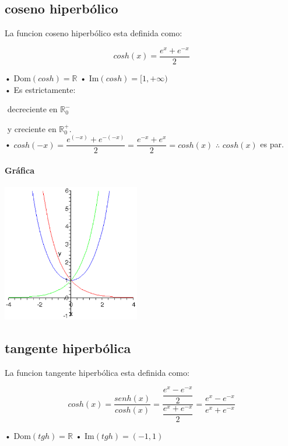 \subsection{coseno hiperbólico}

La funcion coseno hiperbólico esta definida como:

$$cosh(x)=\dfrac{e^x+e^{-x}}{2}$$

• Dom$(cosh) = \mathbb{R}$ \qquad  • Im$(cosh) = [1,+\infty)$\\

• Es estrictamente: 

\qquad $ $\qquad $ $\qquad $ $\qquad $ $\qquad $ $ decreciente en $\mathbb{R} _0 ^-$

\qquad $ $\qquad $ $\qquad $ $\qquad $ $ \qquad $ $y creciente en $\mathbb{R} _0 ^+$.\\

• $cosh(-x) = \dfrac{e^{(-x)}+e^{-(-x)}}{2} = \dfrac{e^{-x}+e^x}{2} = cosh(x)$ \qquad $\therefore$ $cosh(x)$ es par.

\paragraph{Gráfica}
\begin{center}
\includegraphics[height=6cm,width=6cm]{cosh.eps}
\end{center}

\subsection{tangente hiperbólica}

La funcion tangente hiperbólica esta definida como:

$$cosh(x) = \dfrac{senh(x)}{cosh(x)} = \dfrac{\dfrac{e^x-e^{-x}}{2}}{\dfrac{e^x+e^{-x}}{2}} = \dfrac{e^x-e^{-x}}{e^x+e^{-x}}$$

• Dom$(tgh) = \mathbb{R}$ \qquad  • Im$(tgh) = (-1, 1)$\\

